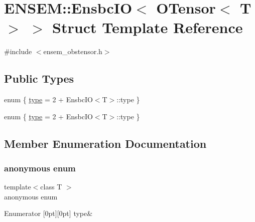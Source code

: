 \hypertarget{structENSEM_1_1EnsbcIO_3_01OTensor_3_01T_01_4_01_4}{}\section{E\+N\+S\+EM\+:\+:Ensbc\+IO$<$ O\+Tensor$<$ T $>$ $>$ Struct Template Reference}
\label{structENSEM_1_1EnsbcIO_3_01OTensor_3_01T_01_4_01_4}


{\ttfamily \#include $<$ensem\+\_\+obstensor.\+h$>$}

\subsection*{Public Types}
\begin{DoxyCompactItemize}
\item 
enum \{ \mbox{\hyperlink{structENSEM_1_1EnsbcIO_3_01OTensor_3_01T_01_4_01_4_af6d3d53de920c661d6c778736fdb1a46a64eda6fb88be434d1c8331318f02a60e}{type}} = 2 + Ensbc\+IO$<$T$>$\+:\+:type
 \}
\item 
enum \{ \mbox{\hyperlink{structENSEM_1_1EnsbcIO_3_01OTensor_3_01T_01_4_01_4_af6d3d53de920c661d6c778736fdb1a46a64eda6fb88be434d1c8331318f02a60e}{type}} = 2 + Ensbc\+IO$<$T$>$\+:\+:type
 \}
\end{DoxyCompactItemize}


\subsection{Member Enumeration Documentation}
\mbox{\label{structENSEM_1_1EnsbcIO_3_01OTensor_3_01T_01_4_01_4_af6d3d53de920c661d6c778736fdb1a46}} 
\subsubsection{\texorpdfstring{anonymous enum}{anonymous enum}}
{\footnotesize\ttfamily template$<$class T $>$ \\
anonymous enum}

\begin{DoxyEnumFields}{Enumerator}
[0pt][0pt]{}\mbox{\label{structENSEM_1_1EnsbcIO_3_01OTensor_3_01T_01_4_01_4_af6d3d53de920c661d6c778736fdb1a46a64eda6fb88be434d1c8331318f02a60e}} 
type&\\
\hline

\end{DoxyEnumFields}
\mbox{\label{structENSEM_1_1EnsbcIO_3_01OTensor_3_01T_01_4_01_4_a5188f985e6c12d0da6329463adc65864}} 

